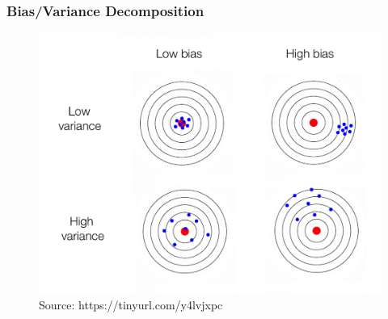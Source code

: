 \documentclass[
  shownotes,
  xcolor={svgnames},
  hyperref={colorlinks,citecolor=DarkBlue,linkcolor=andesred,urlcolor=DarkBlue}
  , aspectratio=169]{beamer}
\begin{document}
\begin{frame}
\frametitle{Bias/Variance Decomposition}

\begin{figure}[H] \centering
  \centering
  \includegraphics[scale=0.15]{figures/medium_bias_variance}
  \\
  \tiny
  Source: https://tinyurl.com/y4lvjxpc
\end{figure}

\end{frame}


\end{document}
